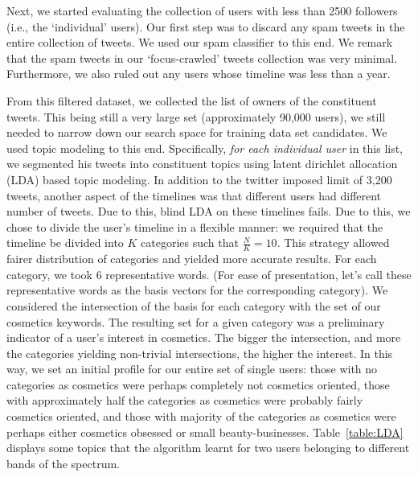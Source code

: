 \documentclass[11pt]{article}
\begin{document}
Next, we started evaluating the collection of users with less than 2500 followers (i.e., the `individual' users).
Our first step was to discard any spam tweets in the entire collection of tweets. We used our 
spam classifier to this end. We remark that the spam tweets in 
our `focus-crawled' tweets collection was very minimal. Furthermore, we also ruled out any
users whose timeline was less than a year. 

From this filtered dataset, we collected the list of owners of the constituent tweets. This being
still a very large set (approximately 90,000 users), we still needed to narrow down our search space
for training data set candidates. We used topic modeling to this end. Specifically,
\textit{for each individual user} in this list, we segmented his tweets into 
constituent topics using latent dirichlet allocation (LDA) based topic modeling.
In addition to the twitter imposed limit of 3,200 tweets, another aspect of the timelines was
that different users had different number of tweets. Due to this, blind LDA on these timelines fails. 
Due to this, we chose to divide the user's timeline in a flexible 
manner: we required that the timeline be divided into $K$ categories such that $\frac{N}{K} = 10.$
This strategy allowed fairer distribution of categories and yielded more accurate results.
For each category, we took 6 representative words. (For ease of presentation, let's call these representative words
as the basis vectors for the corresponding category). We considered the intersection of the 
basis for each category with the set of our cosmetics keywords. The resulting set for a given category
was a preliminary indicator of a user's interest in cosmetics. The bigger the intersection, and more the
categories yielding non-trivial intersections, the higher the interest. In this way, we set an initial profile 
for our entire set of single users: those with no categories as cosmetics were perhaps completely not 
cosmetics oriented, those with approximately half the categories as cosmetics were probably fairly cosmetics oriented,
and those with majority of the categories as cosmetics were perhaps either cosmetics obsessed or small beauty-businesses.
Table~\ref{table:LDA} displays some topics that the algorithm learnt for two users belonging to different bands
of the spectrum.
\end{document}
